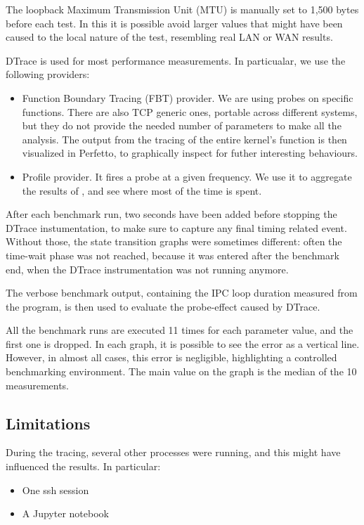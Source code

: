 \documentclass[a4paper,10pt]{article}
\begin{document}
The loopback Maximum Transmission Unit (MTU) is manually set to 1,500 bytes before each test. In this it is possible avoid larger values that might have been caused to the local nature of the test, resembling real LAN or WAN results.

DTrace is used for most performance measurements. In particualar, we use the following providers:

\begin{itemize}
   \item Function Boundary Tracing (FBT) provider. We are using probes on specific functions. There are also TCP generic ones, portable across different systems, but they do not provide the needed number of parameters to make all the analysis. The output from the tracing of the entire kernel's function is then visualized in Perfetto\cite{noauthor_perfetto_nodate}, to graphically inspect for futher interesting behaviours.
   \item Profile provider. It fires a probe at a given frequency. We use it to aggregate the results of , and see where most of the time is spent. 
\end{itemize}

After each benchmark run, two seconds have been added before stopping the DTrace instumentation, to make sure to capture any final timing related event. Without those, the state transition graphs were sometimes different: often the time-wait phase was not reached, because it was entered after the benchmark end, when the DTrace instrumentation was not running anymore.

The verbose benchmark output, containing the IPC loop duration measured from the program, is then used to evaluate the probe-effect caused by DTrace.


All the benchmark runs are executed 11 times for each parameter value, and the first one is dropped. In each graph, it is possible to see the error as a vertical line. However, in almost all cases, this error is negligible, highlighting a controlled benchmarking environment. The main value on the graph is the median of the 10 measurements.



\subsection{Limitations}

During the tracing, several other processes were running, and this might have influenced the results. In particular:
\begin{itemize}
    \item One ssh session
    \item A Jupyter notebook
\end{itemize}
\end{document}
